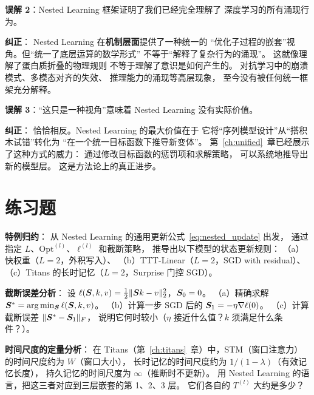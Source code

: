 \begin{misconceptionbox}
\textbf{误解 2}：Nested Learning 框架证明了我们已经完全理解了
深度学习的所有涌现行为。

\textbf{纠正}：
Nested Learning 在\textbf{机制层面}提供了一种统一的
``优化子过程的嵌套''视角。但``统一了底层运算的数学形式''
不等于``解释了复杂行为的涌现''。
这就像理解了蛋白质折叠的物理规则
不等于理解了意识是如何产生的。
对抗学习中的崩溃模式、多模态对齐的失效、
推理能力的涌现等高层现象，
至今没有被任何统一框架充分解释。
\end{misconceptionbox}

\begin{misconceptionbox}
\textbf{误解 3}：``这只是一种视角''意味着 Nested Learning 没有实际价值。

\textbf{纠正}：
恰恰相反。Nested Learning 的最大价值在于
它将``序列模型设计''从``搭积木试错''转化为
``在一个统一目标函数下推导新变体''。
第~\ref{ch:unified}~章已经展示了这种方式的威力：
通过修改目标函数的惩罚项和求解策略，
可以系统地推导出新的模型层。
这是方法论上的真正进步。
\end{misconceptionbox}

\section{练习题}
\label{sec:nested_exercises}

\begin{exercise}
\textbf{特例归约}：
从 Nested Learning 的通用更新公式~\eqref{eq:nested_update} 出发，
通过指定 $L$、$\mathrm{Opt}^{(l)}$、$\ell^{(l)}$ 和截断策略，
推导出以下模型的状态更新规则：
（a）快权重（$L=2$，外积写入）、
（b）TTT-Linear（$L=2$，SGD with residual）、
（c）Titans 的长时记忆（$L=2$，Surprise 门控 SGD）。
\end{exercise}

\begin{exercise}
\textbf{截断误差分析}：
设 $\ell(\boldsymbol{S}, k, v) = \frac{1}{2}\|\boldsymbol{S} k - v\|_2^2$，$\boldsymbol{S}_0 = 0$。
（a）精确求解 $\boldsymbol{S}^* = \arg\min_{\boldsymbol{S}} \ell(\boldsymbol{S}, k, v)$。
（b）计算一步 SGD 后的 $\boldsymbol{S}_1 = -\eta \nabla \ell(0)$。
（c）计算截断误差 $\|\boldsymbol{S}^* - \boldsymbol{S}_1\|_F$，
说明它何时较小（$\eta$ 接近什么值？$k$ 须满足什么条件？）。
\end{exercise}

\begin{exercise}
\textbf{时间尺度的定量分析}：
在 Titans（第~\ref{ch:titans}~章）中，STM（窗口注意力）的时间尺度约为 $W$（窗口大小），
长时记忆的时间尺度约为 $1 / (1-\lambda)$（有效记忆长度），
持久记忆的时间尺度为 $\infty$（推断时不更新）。
用 Nested Learning 的语言，把这三者对应到三层嵌套的第 1、2、3 层。
它们各自的 $T^{(l)}$ 大约是多少？
\end{exercise}

